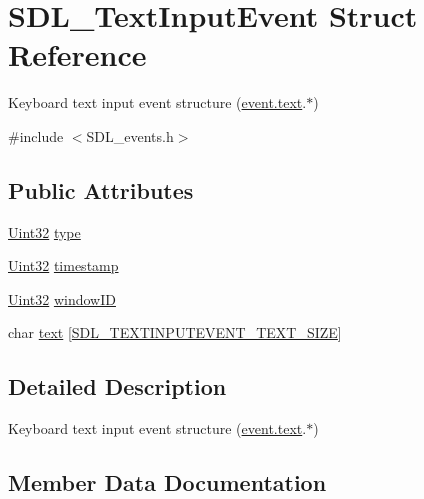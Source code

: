 \hypertarget{struct_s_d_l___text_input_event}{}\section{S\+D\+L\+\_\+\+Text\+Input\+Event Struct Reference}
\label{struct_s_d_l___text_input_event}


Keyboard text input event structure (\hyperlink{union_s_d_l___event_aa4fc65c559d69f33c057c0c23d8414b8}{event.\+text}.$\ast$)  




{\ttfamily \#include $<$S\+D\+L\+\_\+events.\+h$>$}

\subsection*{Public Attributes}
\begin{DoxyCompactItemize}
\item 
\hyperlink{_s_d_l__stdinc_8h_add440eff171ea5f55cb00c4a9ab8672d}{Uint32} \hyperlink{struct_s_d_l___text_input_event_a90576be2ea52e694deff40d0586654f5}{type}
\item 
\hyperlink{_s_d_l__stdinc_8h_add440eff171ea5f55cb00c4a9ab8672d}{Uint32} \hyperlink{struct_s_d_l___text_input_event_a20b190a96494918690ea7f99187be948}{timestamp}
\item 
\hyperlink{_s_d_l__stdinc_8h_add440eff171ea5f55cb00c4a9ab8672d}{Uint32} \hyperlink{struct_s_d_l___text_input_event_aeb4f7a939353990ca40261ffbfbeb3d0}{window\+ID}
\item 
char \hyperlink{struct_s_d_l___text_input_event_a1a95531f466dff01c2f108f53ff24554}{text} \mbox{[}\hyperlink{_s_d_l__events_8h_a43822437fd5e89c1da1841a813cad4aa}{S\+D\+L\+\_\+\+T\+E\+X\+T\+I\+N\+P\+U\+T\+E\+V\+E\+N\+T\+\_\+\+T\+E\+X\+T\+\_\+\+S\+I\+ZE}\mbox{]}
\end{DoxyCompactItemize}


\subsection{Detailed Description}
Keyboard text input event structure (\hyperlink{union_s_d_l___event_aa4fc65c559d69f33c057c0c23d8414b8}{event.\+text}.$\ast$) 

\subsection{Member Data Documentation}
